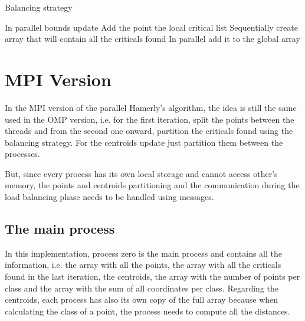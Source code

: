 \documentclass[conference]{IEEEtran}
\begin{document}
\begin{algorithm}[H]
    \caption{Balancing strategy}
    \begin{algorithmic}
        \State \Comment In parallel
        \State bounds update
            \State Add the point the local critical list
        \EndIf 
        \EndFor
        \State \Comment Sequentially
        \State create array that will contain all the criticals found
        \State \Comment In parallel
        \State add it to the global array
    \EndFor
    \end{algorithmic}
\end{algorithm}

\section{MPI Version}
In the MPI version of the parallel Hamerly's algorithm, the idea is still the same used in the OMP version, i.e. for the first iteration, split the points between the threads and from the second one onward, partition the criticals found using the balancing strategy. For the centroids update just partition them between the processes. 

But, since every process has its own local storage and cannot access other's memory, the points and centroids partitioning and the communication during the load balancing phase needs to be handled using messages. 

\subsection{The main process}
In this implementation, process zero is the main process and contains all the information, i.e. the array with all the points, the array with all the criticals found in the last iteration, the centroids, the array with the number of points per class and the array with the sum of all coordinates per class. Regarding the centroids, each process has also its own copy of the full array because when calculating the class of a point, the process needs to compute all the distances.
\end{document}

